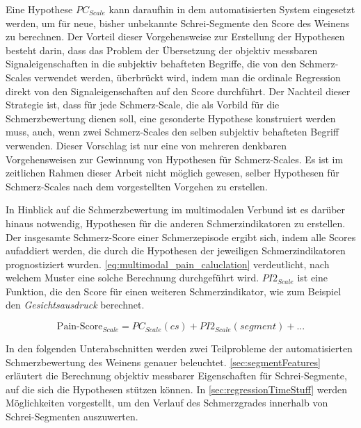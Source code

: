 Eine Hypothese $PC_{Scale}$ kann daraufhin in dem automatisierten System eingesetzt werden, um für neue, bisher unbekannte Schrei-Segmente den Score des Weinens zu berechnen. Der Vorteil dieser Vorgehensweise zur Erstellung der Hypothesen besteht darin, dass das Problem der Übersetzung der objektiv messbaren Signaleigenschaften in die subjektiv behafteten Begriffe, die von den Schmerz-Scales verwendet werden, überbrückt wird, indem man die ordinale Regression direkt von den Signaleigenschaften auf den Score durchführt. Der Nachteil dieser Strategie ist, dass für jede Schmerz-Scale, die als Vorbild für die Schmerzbewertung dienen soll, eine gesonderte Hypothese konstruiert werden muss, auch, wenn zwei Schmerz-Scales den selben subjektiv behafteten Begriff verwenden. Dieser Vorschlag ist nur eine von mehreren denkbaren Vorgehensweisen zur Gewinnung von Hypothesen für Schmerz-Scales. Es ist im zeitlichen Rahmen dieser Arbeit nicht möglich gewesen, selber Hypothesen für Schmerz-Scales nach dem vorgestellten Vorgehen zu erstellen.

In Hinblick auf die Schmerzbewertung im multimodalen Verbund ist es darüber hinaus notwendig, Hypothesen für die anderen Schmerzindikatoren zu erstellen. Der insgesamte Schmerz-Score einer Schmerzepisode ergibt sich, indem alle Scores aufaddiert werden, die durch die Hypothesen der jeweiligen Schmerzindikatoren prognostiziert wurden. \autoref{eq:multimodal_pain_caluclation} verdeutlicht, nach welchem Muster eine solche Berechnung durchgeführt wird. $PI2_{Scale}$ ist eine Funktion, die den Score für einen weiteren Schmerzindikator, wie zum Beispiel den \emph{Gesichtsausdruck} berechnet.

\begin{equation}
\text{Pain-Score}_{Scale} = PC_{Scale}(cs) + PI2_{Scale}(segment) + ...
\label{eq:multimodal_pain_caluclation}
\end{equation}


In den folgenden Unterabschnitten werden zwei Teilprobleme der automatisierten Schmerzbewertung des Weinens genauer beleuchtet. \autoref{sec:segmentFeatures} erläutert die Berechnung objektiv messbarer Eigenschaften für Schrei-Segmente, auf die sich die Hypothesen stützen können. In \autoref{sec:regressionTimeStuff} werden Möglichkeiten vorgestellt, um den Verlauf des Schmerzgrades innerhalb von Schrei-Segmenten auszuwerten.



